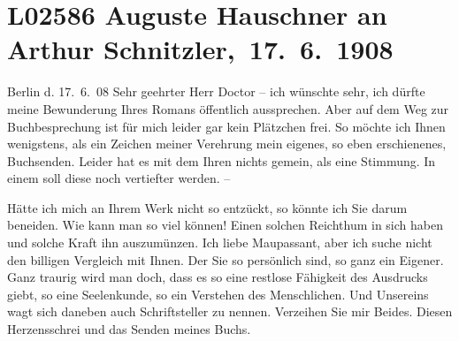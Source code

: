 

\section[ Auguste Hauschner an Arthur Schnitzler, 17. 6. 1908]{L02586 Auguste Hauschner an Arthur Schnitzler, 17. 6. 1908}
\nopagebreak{}
\rehead{ }\normalsize\beginnumbering{}
\toendnotes[C]{\smallbreak\pagebreak[2]}
\toendnotes[C]{\smallbreak}
\pstart
           \raggedleft{}{\pb}Berlin d. 17. 6. 08\pend
           \vspace{0.5em}
\pstart
           Sehr geehrter Herr Doctor – ich wünschte sehr, ich
               dürfte meine Bewunderung Ihres Romans öffentlich aussprechen. Aber auf dem Weg zur Buchbesprechung ist für
               mich leider gar kein Plätzchen frei. So möchte ich Ihnen wenigstens, als ein Zeichen
               meiner Verehrung mein eigenes, so eben erschienenes, Buchsenden. Leider hat es mit dem Ihren nichts gemein, als
               eine Stimmung. In einem \label{K_L02586-1v}\label{K_L02586-1} soll diese noch vertiefter werden. –\pend
           
\pstart
           Hätte ich mich an Ihrem Werk
               nicht so entzückt, so könnte ich Sie darum beneiden. Wie kann man so viel können!
               Einen solchen Reichthum in sich haben und solche Kraft ihn auszumünzen. Ich liebe Maupassant, aber ich suche nicht den billigen
               Vergleich mit Ihnen. Der Sie so persönlich sind, so ganz ein Eigener. {\pb}Ganz traurig wird man doch, dass es so eine restlose
               Fähigkeit des Ausdrucks giebt, so eine Seelenkunde, so ein Verstehen des
               Menschlichen. Und Unsereins wagt sich daneben auch Schriftsteller zu nennen.
               Verzeihen Sie mir Beides. Diesen Herzensschrei und das Senden meines Buchs.\pend
           
